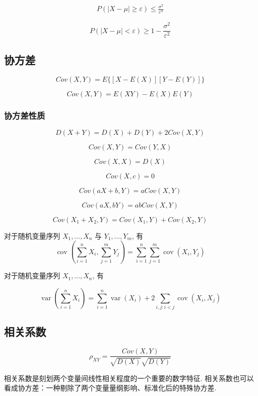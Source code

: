 \begin{theorem}[切比雪夫不等式]
    \label{Chebyshev\'sInequality}
$$
\begin{aligned}
    P(|X-\mu| \ge \varepsilon) \le \frac{\sigma^2}{\varepsilon^2}
\end{aligned}
$$

$$
 P(|X-\mu| < \varepsilon) \ge 1 - \frac{\sigma^2}{\varepsilon^2}
$$
\end{theorem}

\subsection{协方差}

$$
 Cov(X,Y) = E\Big\{ [X - E(X)][Y-E(Y)] \Big\}
$$

$$
 Cov(X,Y) = E(XY) - E(X)E(Y)
$$

\subsubsection{协方差性质}

$$
 D(X+Y) = D(X)+D(Y)+2Cov(X,Y)
$$

$$
 Cov(X,Y) = Cov(Y,X)
$$

$$
 Cov(X,X) = D(X)
$$

$$ Cov(X,c) = 0 $$

$$ Cov(a X + b, Y) = a Cov( X,Y) $$

$$ Cov(aX, bY) = ab Cov(X, Y) $$

$$ Cov(X_1 + X_2 , Y) = Cov(X_1 , Y) + Cov(X_2 , Y) $$

对于随机变量序列 $ X_{1}, \ldots, X_{n} $ 与 $ Y_{1}, \ldots, Y_{m} $, 有
$$
\operatorname{cov}\left(\sum_{i=1}^{n} X_{i}, \sum_{j=1}^{m} Y_{j}\right)=\sum_{i=1}^{n} \sum_{j=1}^{m} \operatorname{cov}\left(X_{i}, Y_{j}\right)
$$

对于随机变量序列 $ X_{1}, \ldots, X_{n} $, 有

$$
\operatorname{var}\left(\sum_{i=1}^{n} X_{i}\right)=\sum_{i=1}^{n} \operatorname{var}\left(X_{i}\right)+2 \sum_{i, j: i<j} \operatorname{cov}\left(X_{i}, X_{j}\right)
$$

\subsection{相关系数}

$$
 \rho_{XY} =   \frac{Cov(X,Y) }{\sqrt{D(X)} \sqrt{D(Y)}}
$$

相关系数是刻划两个变量间线性相关程度的一个重要的数字特征. 相关系数也可以看成协方差：一种剔除了两个变量量纲影响、标准化后的特殊协方差. 

